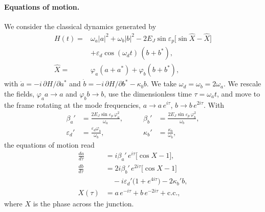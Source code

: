 \documentclass[aps,prx,reprint,floatfix,amsmath,amssymb,longbibliography]{revtex4-2}
\begin{document}
\paragraph*{Equations of motion.}
We consider the classical dynamics generated by
\begin{equation}
\begin{split}
    H(t) = {}& \omega_a |a|^2 + \omega_b |b|^2
    - 2E_J\sin\varepsilon_p\bigl[\sin\hat X - \hat X\bigr]\\
    &+ \varepsilon_d\cos(\omega_d t)\,(b+b^*),\\
    \hat X = {}& \varphi_a(a+a^*) + \varphi_b(b+b^*),
\end{split}
\label{eq:app_H}
\end{equation}
with $\dot a = -i\,\partial H/\partial a^*$ and $\dot b = -i\,\partial H/\partial b^* - \kappa_b b$.
We take $\omega_d=\omega_b=2\omega_a$. We rescale the fields, $\varphi_a a\to a$ and $\varphi_b b\to b$, use the dimensionless time $\tau=\omega_a t$, and move to the frame rotating at the mode frequencies, $a\to a\,e^{i\tau}$, $b\to b\,e^{2i\tau}$. With
\begin{equation}
\begin{aligned}
    \beta_a' &= \frac{2E_J\sin\varepsilon_p\,\varphi_a^2}{\omega_a},&\qquad
    \beta_b' &= \frac{2E_J\sin\varepsilon_p\,\varphi_b^2}{\omega_b},\\
    \varepsilon_d' &= \frac{\varepsilon_d\varphi_b}{\omega_b},&\qquad
    \kappa_b' &= \frac{\kappa_b}{\omega_b},
\end{aligned}
\end{equation}
the equations of motion read
\begin{equation}
\begin{split}
    \frac{da}{d\tau} &= i\beta_a'\,e^{i\tau}\bigl[\cos X - 1\bigr],\\
    \frac{db}{d\tau} &= 2i\beta_b'\,e^{2i\tau}\bigl[\cos X - 1\bigr]\\
    &\quad - i\varepsilon_d'\bigl(1+e^{4i\tau}\bigr) - 2\kappa_b' b,\\
    X(\tau) &= a\,e^{-i\tau} + b\,e^{-2i\tau} + \text{c.c.},
\end{split}
\label{eq:app_eom}
\end{equation}
where $X$ is the phase across the junction.
\end{document}
